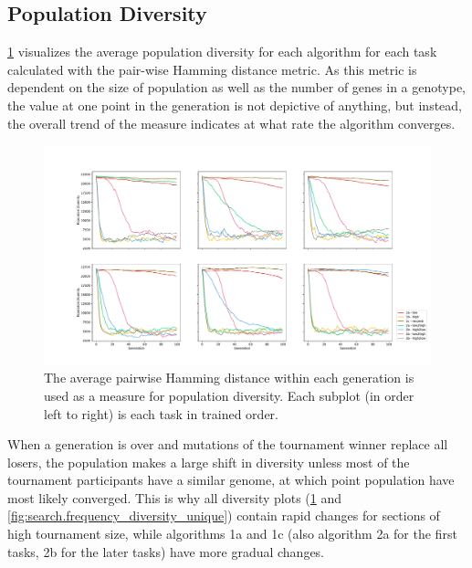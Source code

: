 \subsection{Population Diversity}
\ref{fig:search.hamming_diversity} visualizes the average population diversity for each algorithm for each task calculated with the pair-wise Hamming distance metric. As this metric is dependent on the size of population as well as the number of genes in a genotype, the value at one point in the generation is not depictive of anything, but instead, the overall trend of the measure indicates at what rate the algorithm converges. 

\begin{figure}
    \includegraphics[width=1.2\textwidth,center]{Chapters/4.Experiments/exp2/figures/large/Average_population_diversity_reduced_hamming.pdf}
    \caption{The average pairwise Hamming distance within each generation is used as a measure for population diversity. Each subplot (in order left to right) is each task in trained order.}
    \label{fig:search.hamming_diversity}
\end{figure}

When a generation is over and mutations of the tournament winner replace all losers, the population makes a large shift in diversity unless most of the tournament participants have a similar genome, at which point population have most likely converged. This is why all diversity plots (\ref{fig:search.hamming_diversity} and \ref{fig:search.frequency_diversity_unique}) contain rapid changes for sections of high tournament size, while algorithms 1a and 1c (also algorithm 2a for the first tasks, 2b for the later tasks) have more gradual changes. 

